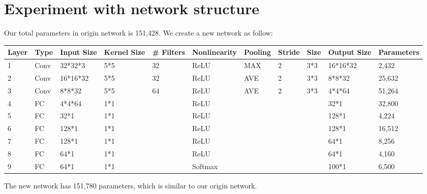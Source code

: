 \documentclass{article} %
\begin{document}
\section{Experiment with network structure}
Our total parameters in origin network is 151,428.
We create a new network as follow:
\begin{table}[H]
    \begin{tabular}{|l|l|l|l|l|l|l|l|l|l|l|}
    \hline
    Layer & Type & Input Size & Kernel Size & \# Filters & Nonlinearity & Pooling & Stride & Size & Output Size & Parameters \\ \hline
    1     & Conv & 32*32*3    & 5*5         & 32         & ReLU         & MAX     & 2      & 3*3  & 16*16*32    & 2,432      \\ \hline
    2     & Conv & 16*16*32   & 5*5         & 32         & ReLU         & AVE     & 2      & 3*3  & 8*8*32      & 25,632     \\ \hline
    3     & Conv & 8*8*32     & 5*5         & 64         & ReLU         & AVE     & 2      & 3*3  & 4*4*64      & 51,264     \\ \hline
    4     & FC   & 4*4*64     & 1*1         & ~          & ReLU         & ~       & ~      & ~    & 32*1        & 32,800     \\ \hline
    5     & FC   & 32*1       & 1*1         & ~          & ReLU         & ~       & ~      & ~    & 128*1       & 4,224      \\ \hline
    6     & FC   & 128*1      & 1*1         & ~          & ReLU         & ~       & ~      & ~    & 128*1       & 16,512     \\ \hline
    7     & FC   & 128*1      & 1*1         & ~          & ReLU         & ~       & ~      & ~    & 64*1        & 8,256      \\ \hline
    8     & FC   & 64*1       & 1*1         & ~          & ReLU         & ~       & ~      & ~    & 64*1        & 4,160      \\ \hline
    9     & FC   & 64*1       & 1*1         & ~          & Softmax      & ~       & ~      & ~    & 100*1       & 6,500      \\ \hline
    \end{tabular}
\end{table}
The new network has 151,780 parameters, which is similar to our origin network.\\
\end{document}
